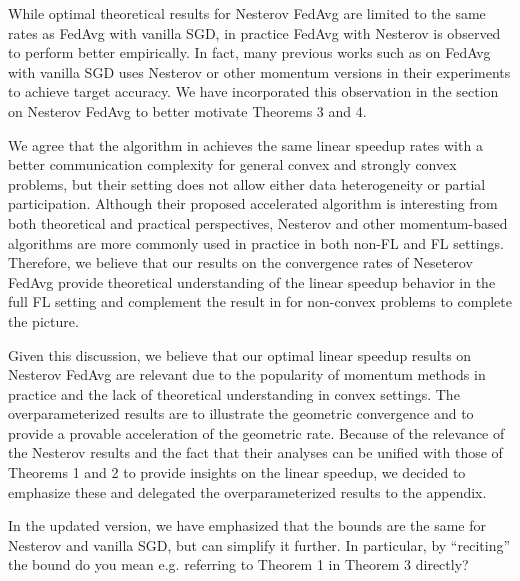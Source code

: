 \documentclass{article}
\begin{document}
While optimal theoretical results for Nesterov FedAvg are limited to the same rates as FedAvg with vanilla SGD, in practice FedAvg with Nesterov is observed to perform better empirically. In fact, many previous works such as \cite{stich2018local} on FedAvg with vanilla SGD uses Nesterov or other momentum versions in their experiments to achieve target accuracy. We have incorporated this observation in the section on Nesterov FedAvg to better motivate Theorems 3 and 4.

We agree that the algorithm in \cite{yuan2020federated} achieves the same linear speedup rates with a better communication complexity for general convex and strongly convex problems, but their setting does not allow either data heterogeneity or partial participation. Although their proposed accelerated algorithm is interesting from both theoretical and practical perspectives, Nesterov and other momentum-based algorithms are more commonly used in practice in both non-FL and FL settings. Therefore, we believe that our results on the convergence rates of Neseterov FedAvg provide theoretical understanding of the linear speedup behavior in the full FL setting and complement the result in \cite{yu2019linear} for non-convex problems to complete the picture.

Given this discussion, we believe that our optimal linear speedup results on Nesterov FedAvg are relevant due to the popularity of momentum methods in practice and the lack of theoretical understanding in convex settings. The overparameterized results are to illustrate the geometric convergence and to provide a provable acceleration of the geometric rate. Because of the relevance of the Nesterov results and the fact that their analyses can be unified with those of Theorems 1 and 2 to provide insights on the linear speedup, we decided to emphasize these and delegated the overparameterized results to the appendix. 

In the updated version, we have emphasized that the bounds are the same for Nesterov and vanilla SGD, but can simplify it further. In particular, by ``reciting'' the bound do you mean e.g. referring to Theorem 1 in Theorem 3 directly?

\begin{comment}
{If the reviewer believes that changes in emphasis are still necessary given our responses and Reviewer 4's comments on the overparameterized setting, we are definitely willing to make the necessary changes.}
\end{comment}
\end{document}
